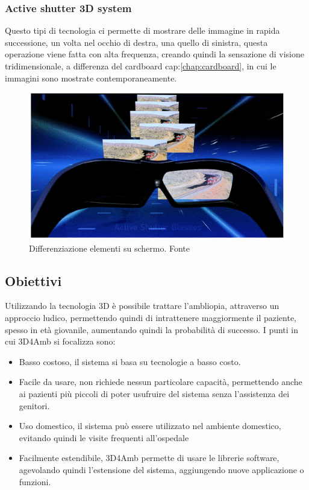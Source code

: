 \documentclass[10pt,a4paper]{article}
\begin{document}
	\subsubsection{Active shutter 3D system}
	Questo tipi di tecnologia ci permette di mostrare delle immagine in rapida successione, un volta nel occhio di destra, una quello di sinistra, questa operazione viene fatta con alta frequenza, creando quindi la sensazione di visione tridimensionale, a differenza del cardboard cap:\ref{chap:cardboard}, in cui le immagini sono mostrate contemporaneamente.
		\begin{figure}[H]
		\centering
		\includegraphics[width=0.8\linewidth]{image/active-shutter-3d-technology}
		\caption{Differenziazione elementi su schermo.\newline
			Fonte\cite{active-shutter-3d_image}}
		\label{fig:occhiali active-shutter-3d-technology}
	\end{figure}

	\subsection{Obiettivi}
	Utilizzando la tecnologia 3D è possibile trattare l'ambliopia, attraverso un approccio ludico, permettendo quindi di intrattenere maggiormente il paziente, spesso in età giovanile, aumentando quindi la probabilità di successo.
	I punti in cui 3D4Amb si focalizza sono:
	\begin{itemize}
		\item Basso costoso, il sistema si basa su tecnologie a basso costo.
		\item Facile da usare, non richiede nessun particolare capacità, permettendo anche ai pazienti più piccoli di poter usufruire del sistema senza l'assistenza dei genitori.
		\item Uso domestico, il sistema può essere utilizzato nel ambiente domestico, evitando quindi le visite frequenti all'ospedale
		\item Facilmente estendibile, 3D4Amb permette di usare le librerie software, agevolando  quindi l'estensione del sistema, aggiungendo nuove applicazione o funzioni.
	\end{itemize}
    \newpage
    \null
    \newpage
\end{document}
